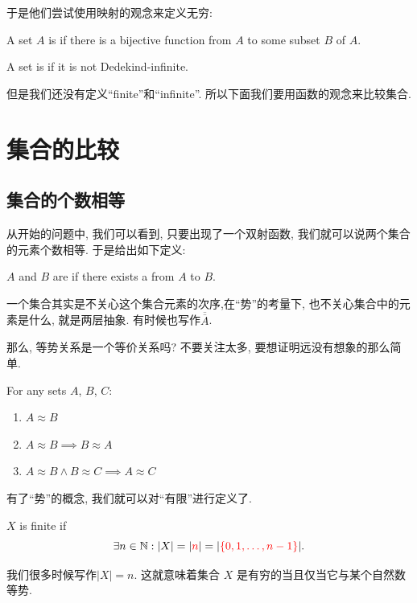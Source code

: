 于是他们尝试使用映射的观念来定义无穷: 
\begin{definition}
    A set $A$ is 
    if there is a bijective function from $A$ to some  subset $B$ of $A$. 

    A set is  if it is not Dedekind-infinite.
\end{definition}

但是我们还没有定义``finite''和``infinite''. 所以下面我们要用函数的观念来比较集合. 

\section{集合的比较}

\subsection{集合的个数相等}

从开始的问题中, 我们可以看到, 只要出现了一个双射函数, 我们就可以说两个集合的元素个数相等. 于是给出如下定义:
\begin{definition}[$|A| = |B| \;(A \approx B)$ (1878)]
    $A$ and $B$ are 
    if there exists a  from $A$ to $B$.
\end{definition}

一个集合其实是不关心这个集合元素的次序,在``势''的考量下, 也不关心集合中的元素是什么, 就是两层抽象. 有时候也写作$\overline{\overline{A}}$. 

那么, 等势关系是一个等价关系吗? 不要关注太多, 要想证明远没有想象的那么简单.

\begin{theorem}{}
    For any sets $A$, $B$, $C$:
    \begin{enumerate}
      \item $A \approx B$
      \item $A \approx B \implies B \approx A$
      \item $A \approx B \land B \approx C \implies A \approx C$
    \end{enumerate}
\end{theorem}

有了``势''的概念, 我们就可以对``有限''进行定义了. 
\begin{definition}[Finite]
    $X$ is finite if
    \[
      \exists n \in \mathbb{N}: |X| = |\textcolor{red}{n}| = |\textcolor{red}{\{0, 1, \dots, n-1\}}|.
    \]
\end{definition}
我们很多时候写作$|X| = n$. 这就意味着集合 $X$ 是有穷的当且仅当它与某个自然数等势. 

